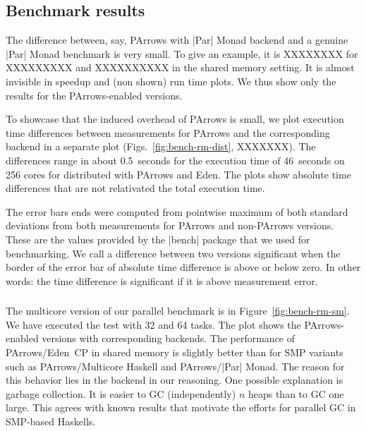 

\subsection{Benchmark results}

The difference between, say, PArrows with |Par| Monad backend and a
genuine |Par|
Monad benchmark is very small. To give an example, it is XXXXXXXX for
XXXXXXXXX and XXXXXXXXXX in the shared memory setting. It is almost invisible in speedup and
(non shown) run time plots. We thus show only the results for the
PArrows-enabled versions.

To showcase that the induced overhead of
PArrows is small, we plot execution time differences between measurements for
PArrows and the corresponding backend in a separate plot
(Figs.~\ref{fig:bench-rm-dist}, XXXXXXX). The differences range in
about 0.5~seconds for the execution time of 46~seconds on 256 cores
for distributed \rmtest with PArrows and Eden. The plots show absolute
time differences that are not relativated \wrt the total execution time.

The error bars ends were computed from pointwise maximum of both standard
deviations from both measurements for PArrows and non-PArrows
versions. These are the values provided by the |bench| package that we
used for benchmarking. We call a difference between two versions
significant when the border of the error bar of absolute time
difference is above or below zero. In other words: the time
difference is significant if it is above measurement error.

\subsubsection{\rmtest}
The multicore version of our parallel \rmtest benchmark is in
Figure~\ref{fig:bench-rm-sm}. We have executed the test with 32 and 64
tasks. The plot shows the PArrows-enabled versions with corresponding backends.
The performance of PArrows/Eden~CP in shared memory is slightly better than
for SMP variants such as PArrows/Multicore Haskell and PArrows/|Par|
Monad. The reason for this behavior lies in the backend in our reasoning. One
possible explanation is garbage collection. It is easier to GC
(independently) $n$ heaps than to GC one large. This agrees with known
results that motivate the efforts for
parallel GC in SMP-based Haskells.

